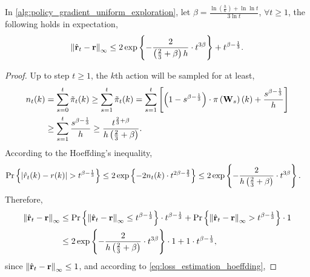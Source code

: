 \begin{thm}
\label{thm:reward_estimation_hoeffding}
    In \cref{alg:policy_gradient_uniform_exploration}, let $\beta = \frac{ \ln{\left(\frac{h}{6}\right) + \ln{\ln{t}} } }{ 3 \ln{t}}$, $\forall t \ge 1$, the following holds in expectation,
\begin{equation*}
    \left\| \hat{{\mathbf{r}}}_t - {\mathbf{r}} \right\|_\infty \le 2 \exp\left\{ - \frac{2}{ \left(\frac{2}{3} + \beta \right) h } \cdot t^{3\beta} \right\} + t^{\beta - \frac{1}{3}}.
\end{equation*}
\end{thm}
\begin{proof}
    Up to step $t \ge 1$, the $k$th action will be sampled for at least,
\begin{equation*}
\begin{split}
    n_t(k) &= \sum\limits_{s=0}^{t}{ \tilde{\pi}_t(k)} \ge \sum\limits_{s=1}^{t}{ \tilde{\pi}_t(k)} = \sum\limits_{s=1}^{t}{ \left[ \left( 1 - s^{\beta - \frac{1}{3}} \right) \cdot \pi\left({\mathbf{W}}_{s}\right)(k) + \frac{s^{\beta - \frac{1}{3}}}{h} \right] } \\
    &\ge \sum\limits_{s=1}^{t}{ \frac{s^{\beta - \frac{1}{3}}}{h} } \ge \frac{t^{\frac{2}{3} + \beta}}{ h  \left(\frac{2}{3} + \beta \right) }.
\end{split}
\end{equation*}
According to the Hoeffding's inequality,
\begin{equation}
\label{eq:loss_estimation_hoeffding}
\begin{split}
    {\text{Pr}}\left\{ \left| \hat{r}_{t}(k) - r(k) \right| > t^{\beta - \frac{1}{3}} \right\} &\le 2 \exp\left\{ - 2 n_{t}(k) \cdot t^{2\beta - \frac{2}{3}} \right\} \le 2 \exp\left\{ - \frac{2}{ h  \left(\frac{2}{3} + \beta \right) } \cdot t^{3\beta} \right\}.
\end{split}
\end{equation}
Therefore,
\begin{equation*}
\begin{split}
    \left\| \hat{{\mathbf{r}}}_t - {\mathbf{r}} \right\|_\infty &\le {\text{Pr}}\left\{ \left\| \hat{{\mathbf{r}}}_t - {\mathbf{r}} \right\|_\infty \le t^{\beta - \frac{1}{3}} \right\} \cdot t^{\beta - \frac{1}{3}} + {\text{Pr}}\left\{ \left\| \hat{{\mathbf{r}}}_t - {\mathbf{r}} \right\|_\infty > t^{\beta - \frac{1}{3}} \right\} \cdot 1 \\
    &\le 2 \exp\left\{ - \frac{2}{ h  \left(\frac{2}{3} + \beta \right) } \cdot t^{3\beta} \right\} \cdot 1 + 1 \cdot t^{\beta - \frac{1}{3}},
\end{split}
\end{equation*}
since $\left\| \hat{{\mathbf{r}}}_t - {\mathbf{r}} \right\|_\infty \le 1$, and according to \cref{eq:loss_estimation_hoeffding}, 
\end{proof}

